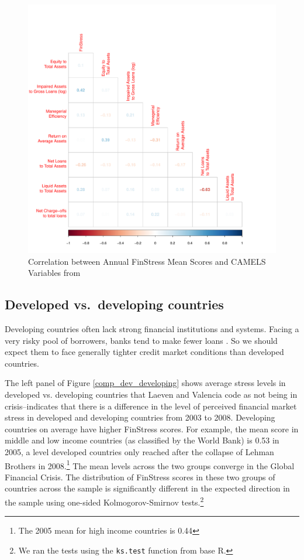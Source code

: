 \documentclass[]{article}
\begin{document}
\begin{figure}[H]
	\caption{Correlation between Annual FinStress Mean Scores and CAMELS Variables from \cite{Andrianova2015}}
    \label{cor_camel}
    \begin{center}
    	\includegraphics[scale=0.5]{figures/ff_corr_matrix.pdf}
    \end{center}
\end{figure}

\subsection*{Developed vs.~developing
countries}\label{developed-vs.developing-countries}

Developing countries often lack strong financial institutions and systems. Facing a very risky pool of borrowers, banks tend to make fewer loans \citep{Andrianova2014}. So we should expect them to face generally tighter credit market conditions than developed countries.

The left panel of Figure \ref{comp_dev_developing} shows average stress levels in developed vs. developing countries that Laeven and Valencia code as not being in crisis--indicates that there is a difference in the level of perceived financial market stress in developed and developing countries from 2003 to 2008. Developing countries on average have higher FinStress scores. For example, the mean score in middle and low income countries (as classified by the World Bank) is 0.53 in 2005, a level developed countries only reached after the collapse of Lehman Brothers in 2008.\footnote{The 2005 mean for high income countries is 0.44} The mean levels across the two groups converge in the Global Financial Crisis. The distribution of FinStress scores in these two groups of countries across the sample is significantly different in the expected direction in the sample using one-sided Kolmogorov-Smirnov tests.\footnote{We ran the tests using the \texttt{ks.test} function from base R.}
\end{document}
